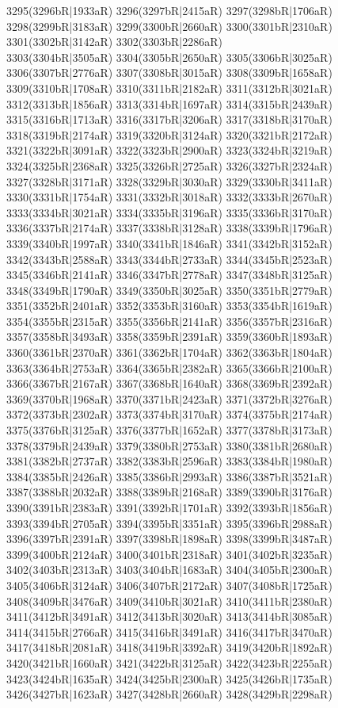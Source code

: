 3295(3296bR|1933aR) 3296(3297bR|2415aR) 3297(3298bR|1706aR) 3298(3299bR|3183aR) 3299(3300bR|2660aR) 3300(3301bR|2310aR) 3301(3302bR|3142aR) 3302(3303bR|2286aR) \\3303(3304bR|3505aR) 3304(3305bR|2650aR) 3305(3306bR|3025aR) 3306(3307bR|2776aR) 3307(3308bR|3015aR) 3308(3309bR|1658aR) 3309(3310bR|1708aR) 3310(3311bR|2182aR) 3311(3312bR|3021aR) \\3312(3313bR|1856aR) 3313(3314bR|1697aR) 3314(3315bR|2439aR) 3315(3316bR|1713aR) 3316(3317bR|3206aR) 3317(3318bR|3170aR) 3318(3319bR|2174aR) 3319(3320bR|3124aR) 3320(3321bR|2172aR) \\3321(3322bR|3091aR) 3322(3323bR|2900aR) 3323(3324bR|3219aR) 3324(3325bR|2368aR) 3325(3326bR|2725aR) 3326(3327bR|2324aR) 3327(3328bR|3171aR) 3328(3329bR|3030aR) 3329(3330bR|3411aR) \\3330(3331bR|1754aR) 3331(3332bR|3018aR) 3332(3333bR|2670aR) 3333(3334bR|3021aR) 3334(3335bR|3196aR) 3335(3336bR|3170aR) 3336(3337bR|2174aR) 3337(3338bR|3128aR) 3338(3339bR|1796aR) \\3339(3340bR|1997aR) 3340(3341bR|1846aR) 3341(3342bR|3152aR) 3342(3343bR|2588aR) 3343(3344bR|2733aR) 3344(3345bR|2523aR) 3345(3346bR|2141aR) 3346(3347bR|2778aR) 3347(3348bR|3125aR) \\3348(3349bR|1790aR) 3349(3350bR|3025aR) 3350(3351bR|2779aR) 3351(3352bR|2401aR) 3352(3353bR|3160aR) 3353(3354bR|1619aR) 3354(3355bR|2315aR) 3355(3356bR|2141aR) 3356(3357bR|2316aR) \\3357(3358bR|3493aR) 3358(3359bR|2391aR) 3359(3360bR|1893aR) 3360(3361bR|2370aR) 3361(3362bR|1704aR) 3362(3363bR|1804aR) 3363(3364bR|2753aR) 3364(3365bR|2382aR) 3365(3366bR|2100aR) \\3366(3367bR|2167aR) 3367(3368bR|1640aR) 3368(3369bR|2392aR) 3369(3370bR|1968aR) 3370(3371bR|2423aR) 3371(3372bR|3276aR) 3372(3373bR|2302aR) 3373(3374bR|3170aR) 3374(3375bR|2174aR) \\3375(3376bR|3125aR) 3376(3377bR|1652aR) 3377(3378bR|3173aR) 3378(3379bR|2439aR) 3379(3380bR|2753aR) 3380(3381bR|2680aR) 3381(3382bR|2737aR) 3382(3383bR|2596aR) 3383(3384bR|1980aR) \\3384(3385bR|2426aR) 3385(3386bR|2993aR) 3386(3387bR|3521aR) 3387(3388bR|2032aR) 3388(3389bR|2168aR) 3389(3390bR|3176aR) 3390(3391bR|2383aR) 3391(3392bR|1701aR) 3392(3393bR|1856aR) \\3393(3394bR|2705aR) 3394(3395bR|3351aR) 3395(3396bR|2988aR) 3396(3397bR|2391aR) 3397(3398bR|1898aR) 3398(3399bR|3487aR) 3399(3400bR|2124aR) 3400(3401bR|2318aR) 3401(3402bR|3235aR) \\3402(3403bR|2313aR) 3403(3404bR|1683aR) 3404(3405bR|2300aR) 3405(3406bR|3124aR) 3406(3407bR|2172aR) 3407(3408bR|1725aR) 3408(3409bR|3476aR) 3409(3410bR|3021aR) 3410(3411bR|2380aR) \\3411(3412bR|3491aR) 3412(3413bR|3020aR) 3413(3414bR|3085aR) 3414(3415bR|2766aR) 3415(3416bR|3491aR) 3416(3417bR|3470aR) 3417(3418bR|2081aR) 3418(3419bR|3392aR) 3419(3420bR|1892aR) \\3420(3421bR|1660aR) 3421(3422bR|3125aR) 3422(3423bR|2255aR) 3423(3424bR|1635aR) 3424(3425bR|2300aR) 3425(3426bR|1735aR) 3426(3427bR|1623aR) 3427(3428bR|2660aR) 3428(3429bR|2298aR) 